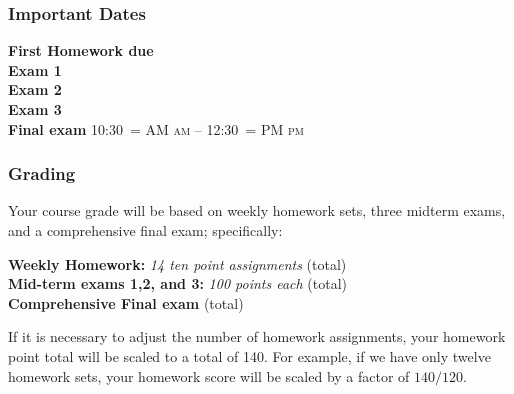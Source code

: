 \documentclass[12pt]{article}
\makeatletter
\newcounter{ex}\setcounter{ex}{0}
\newenvironment{mypar}[2]
  {\begin{list}{}%
    {\setlength\leftmargin{#1}
    \setlength\rightmargin{#2}}
    \item[]}
  {\end{list}}
\DeclareRobustCommand{\maybefakesc}[1]{%
  \ifnum\pdfstrcmp{\f@series}{\bfdefault}=\z@
    {\fontsize{\dimexpr0.8\dimexpr\f@size pt\relax}{0}\selectfont\uppercase{#1}}%
  \else
    \textsc{#1}%
  \fi
}
\newcommand\AM{\,\maybefakesc{am}\xspace}
\newcommand\PM{\,\maybefakesc{pm}\xspace}
\makeatother
\begin{document}
\subsubsection*{Important Dates}

\begin{mypar}{0.25in}{0.25in} 

      \textbf{First Homework due} \dotfill  {}  \\
       \textbf{Exam 1} \dotfill {}  \\
    \textbf{Exam 2} \dotfill  {} \\
    \textbf{Exam 3} \dotfill {} \\
      \textbf{Final exam} \dotfill  {} 10:30\AM -- 12:30\PM
\end{mypar}



\subsubsection*{Grading}

Your course grade will be based on weekly homework sets, three midterm exams, and a comprehensive 
final exam; specifically:
\begin{mypar}{0.25in}{0.25in}
    \textbf{Weekly Homework:}  \emph{14 ten point assignments}   (total) \\
    \textbf{Mid-term exams 1,2, and 3:} \emph{100 points each}  (total)\\
      \textbf{Comprehensive Final exam}  (total)
\end{mypar}
If it is necessary to adjust the number of  homework assignments,  your homework point 
total will be scaled to a total of 140.  For example, if we have only twelve homework sets, your homework score will
be scaled by a factor of \(140/120\).




\end{document}

